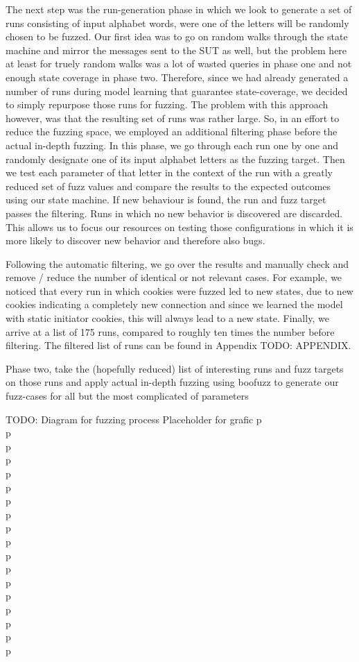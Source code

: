 The next step was the run-generation phase in which we look to generate a set of runs consisting of input alphabet words, were one of the letters will be randomly chosen to be fuzzed. Our first idea was to go on random walks through the state machine and mirror the messages sent to the SUT as well, but the problem here at least for truely random walks was a lot of wasted queries in phase one and not enough state coverage in phase two. Therefore, since we had already generated a number of runs during model learning that guarantee state-coverage, we decided to simply repurpose those runs for fuzzing. The problem with this approach however, was that the resulting set of runs was rather large. So, in an effort to reduce the fuzzing space, we employed an additional filtering phase before the actual in-depth fuzzing. In this phase, we go through each run one by one and randomly designate one of its input alphabet letters as the fuzzing target. Then we test each parameter of that letter in the context of the run with a greatly reduced set of fuzz values and compare the results to the expected outcomes using our state machine. If new behaviour is found, the run and fuzz target passes the filtering. Runs in which no new behavior is discovered are discarded. This allows us to focus our resources on testing those configurations in which it is more likely to discover new behavior and therefore also bugs. 

Following the automatic filtering, we go over the results and manually check and remove / reduce the number of identical or not relevant cases. For example, we noticed that every run in which cookies were fuzzed led to new states, due to new cookies indicating a completely new connection and since we learned the model with static initiator cookies, this will always lead to a new state. 
Finally, we arrive at a list of 175 runs, compared to roughly ten times the number before filtering. The filtered list of runs can be found in Appendix TODO: APPENDIX.




Phase two, take the (hopefully reduced) list of interesting runs and fuzz targets on those runs and apply actual in-depth fuzzing using boofuzz to generate our fuzz-cases for all but the most complicated of parameters

TODO: Diagram for fuzzing process
Placeholder for grafic
p\\
p\\
p\\
p\\
p\\
p\\
p\\
p\\
p\\
p\\
p\\
p\\
p\\
p\\
p\\
p\\
p\\
p\\
